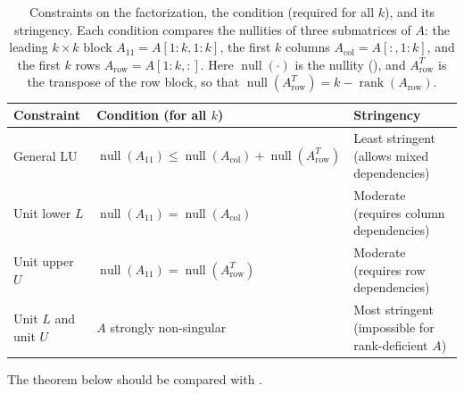 \documentclass[final]{siamart1116}
\numberwithin{theorem}{section}
\DeclareMathOperator{\rk}{rank}
\DeclareMathOperator{\nl}{null}
\begin{document}
\begin{table}[htbp]
  \caption{Constraints on the factorization, the condition (required for all $k$), and its stringency. Each condition compares the nullities of three submatrices of $A$: the leading $k \times k$ block $A_{11} = A[1:k,1:k]$, the first $k$ columns $A_{\mathrm{col}} = A[:,1:k]$, and the first $k$ rows $A_{\mathrm{row}} = A[1:k,:]$. Here $\nl(\cdot)$ is the nullity (), and $A_{\mathrm{row}}^{T}$ is the transpose of the row block, so that $\nl(A_{\mathrm{row}}^{T}) = k - \rk(A_{\mathrm{row}})$.}
  \label{tab:constraints}
  \centering
  \begin{tabularx}{\linewidth}{@{}ll>{\raggedright\arraybackslash}X@{}}
    \toprule
    Constraint & Condition (for all $k$) & Stringency \\
    \midrule
    General LU            & $\nl(A_{11}) \le \nl(A_{\mathrm{col}}) + \nl(A_{\mathrm{row}}^{T})$ & Least stringent (allows mixed dependencies) \\
    Unit lower $L$        & $\nl(A_{11}) = \nl(A_{\mathrm{col}})$                                & Moderate (requires column dependencies) \\
    Unit upper $U$        & $\nl(A_{11}) = \nl(A_{\mathrm{row}}^{T})$                            & Moderate (requires row dependencies) \\
    Unit $L$ and unit $U$ & $A$ strongly non-singular                                            & Most stringent (impossible for rank-deficient $A$) \\
    \bottomrule
  \end{tabularx}
\end{table}

The theorem below should be compared with .
\end{document}
